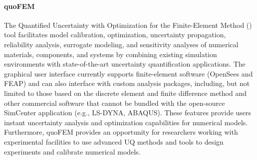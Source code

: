 \paragraph{quoFEM} The Quantified Uncertainty with Optimization for the Finite-Element Method () tool facilitates model calibration, optimization, uncertainty propagation, reliability analysis, surrogate modeling, and sensitivity analyses of numerical materials, components, and systems by combining existing simulation environments with state-of-the-art uncertainty quantification applications. The graphical user interface currently supports finite-element software (OpenSees and FEAP) and can also interface with custom analysis packages, including, but not limited to those based on the discrete element and finite difference method and other commercial software that cannot be bundled with the open-source SimCenter application (e.g., LS-DYNA, ABAQUS). These features provide users instant uncertainty analysis and optimization capabilities for numerical models. Furthermore, quoFEM provides an opportunity for researchers working with experimental facilities to use advanced UQ methods and tools to design experiments and calibrate numerical models.



